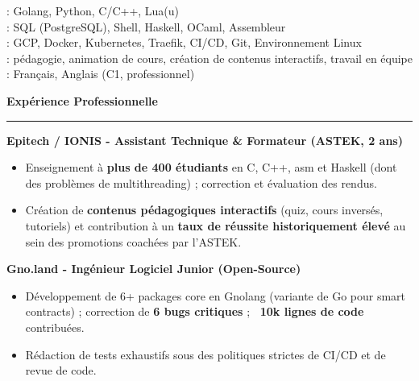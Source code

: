 \documentclass[9pt]{extarticle}
\begin{document}
\hspace*{5pt}{\bfseries Maîtrise}: Golang, Python, C/C++, Lua(u)
\\
\hspace*{5pt}{\bfseries Bonne connaissance}: SQL (PostgreSQL), Shell, Haskell, OCaml, Assembleur
\\
\hspace*{5pt}{\bfseries Cloud \& DevOps}: GCP, Docker, Kubernetes, Traefik, CI/CD, Git, Environnement Linux
\\
\hspace*{5pt}{\bfseries Transverses}: pédagogie, animation de cours, création de contenus interactifs, travail en équipe
\\
\hspace*{5pt}{\bfseries Langues}: Français, Anglais (C1, professionnel)

\par\vspace{5pt}


{\large\bfseries Expérience Professionnelle}
\par\vspace{-8pt}
\rule{\linewidth}{0.4pt}
\par\vspace{5pt}

{\bfseries Epitech / IONIS - Assistant Technique \& Formateur (ASTEK, 2 ans)}
\begin{itemize}[noitemsep, topsep=0pt]
	\item Enseignement à {\bfseries plus de 400 étudiants} en C, C++, asm et Haskell (dont des problèmes de multithreading) ; correction et évaluation des rendus.
	\item Création de {\bfseries contenus pédagogiques interactifs} (quiz, cours inversés, tutoriels) et contribution à un {\bfseries taux de réussite historiquement élevé} au sein des promotions coachées par l'ASTEK.
\end{itemize}

\par\vspace{5pt}

{\bfseries Gno.land - Ingénieur Logiciel Junior (Open-Source)}
\begin{itemize}[noitemsep, topsep=0pt]
	\item Développement de 6+ packages core en Gnolang (variante de Go pour smart contracts) ; correction de {\bfseries 6 bugs critiques} ; {\bfseries ~10k lignes de code} contribuées.
	\item Rédaction de tests exhaustifs sous des politiques strictes de CI/CD et de revue de code.
\end{itemize}
\end{document}
